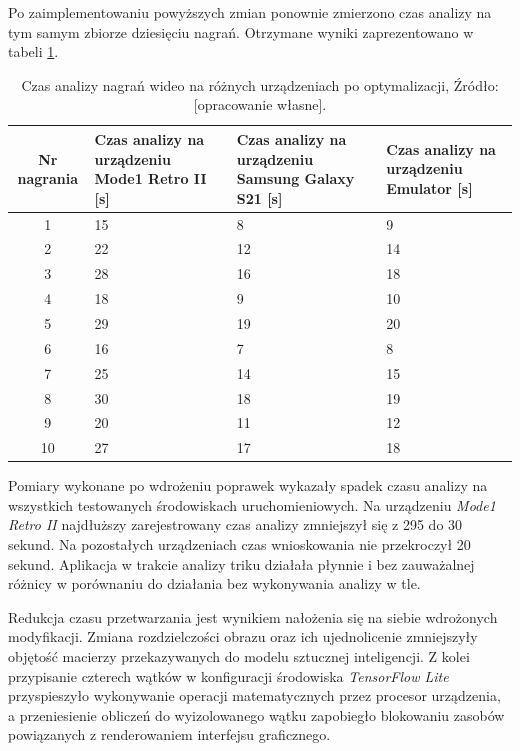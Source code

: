         Po zaimplementowaniu powyższych zmian ponownie zmierzono czas analizy na tym samym zbiorze dziesięciu nagrań. Otrzymane wyniki zaprezentowano w tabeli \ref{tab:time_after}.

        \begin{table}[!ht] \centering
    \caption{Czas analizy nagrań wideo na różnych urządzeniach po optymalizacji, Źródło: [opracowanie własne].}
    \label{tab:time_after} 
    \begin{tabularx}{\textwidth}{ | c | X | X | X | } \hline
        \textbf{Nr nagrania} & Czas analizy na urządzeniu \textbf{Mode1 Retro II [s]} & Czas analizy na urządzeniu \textbf{Samsung Galaxy S21 [s]} & Czas analizy na urządzeniu \textbf{Emulator [s]} \\ \hline
        1 & 15 & 8 & 9 \\ \hline
        2 & 22 & 12 & 14 \\ \hline
        3 & 28 & 16 & 18 \\ \hline
        4 & 18 & 9 & 10 \\ \hline
        5 & 29 & 19 & 20 \\ \hline
        6 & 16 & 7 & 8 \\ \hline
        7 & 25 & 14 & 15 \\ \hline
        8 & 30 & 18 & 19 \\ \hline
        9 & 20 & 11 & 12 \\ \hline
        10 & 27 & 17 & 18 \\ \hline
    \end{tabularx}
\end{table}

Pomiary wykonane po wdrożeniu poprawek wykazały spadek czasu analizy na wszystkich testowanych środowiskach uruchomieniowych. Na urządzeniu \textit{Mode1 Retro II} najdłuższy zarejestrowany czas analizy zmniejszył się z 295 do 30 sekund. Na pozostałych urządzeniach czas wnioskowania nie przekroczył 20 sekund. Aplikacja w trakcie analizy triku działała płynnie i bez zauważalnej różnicy w porównaniu do działania bez wykonywania analizy w tle.

Redukcja czasu przetwarzania jest wynikiem nałożenia się na siebie wdrożonych modyfikacji. Zmiana rozdzielczości obrazu oraz ich ujednolicenie zmniejszyły objętość macierzy przekazywanych do modelu sztucznej inteligencji. Z kolei przypisanie czterech wątków w konfiguracji środowiska \textit{TensorFlow Lite} przyspieszyło wykonywanie operacji matematycznych przez procesor urządzenia, a przeniesienie obliczeń do wyizolowanego wątku zapobiegło blokowaniu zasobów powiązanych z renderowaniem interfejsu graficznego.

